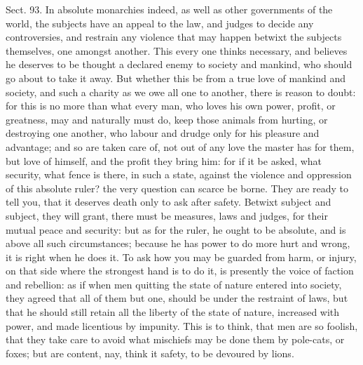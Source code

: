 \documentclass[11pt,openany]{book}
\begin{document}
Sect. 93. In absolute monarchies indeed, as well as other governments of the world, the subjects have an appeal to the law, and judges to decide any controversies, and restrain any violence that may happen betwixt the subjects themselves, one amongst another. This every one thinks necessary, and believes he deserves to be thought a declared enemy to society and mankind, who should go about to take it away. But whether this be from a true love of mankind and society, and such a charity as we owe all one to another, there is reason to doubt: for this is no more than what every man, who loves his own power, profit, or greatness, may and naturally must do, keep those animals from hurting, or destroying one another, who labour and drudge only for his pleasure and advantage; and so are taken care of, not out of any love the master has for them, but love of himself, and the profit they bring him: for if it be asked, what security, what fence is there, in such a state, against the violence and oppression of this absolute ruler? the very question can scarce be borne. They are ready to tell you, that it deserves death only to ask after safety. Betwixt subject and subject, they will grant, there must be measures, laws and judges, for their mutual peace and security: but as for the ruler, he ought to be absolute, and is above all such circumstances; because he has power to do more hurt and wrong, it is right when he does it. To ask how you may be guarded from harm, or injury, on that side where the strongest hand is to do it, is presently the voice of faction and rebellion: as if when men quitting the state of nature entered into society, they agreed that all of them but one, should be under the restraint of laws, but that he should still retain all the liberty of the state of nature, increased with power, and made licentious by impunity. This is to think, that men are so foolish, that they take care to avoid what mischiefs may be done them by pole-cats, or foxes; but are content, nay, think it safety, to be devoured by lions.
\end{document}
